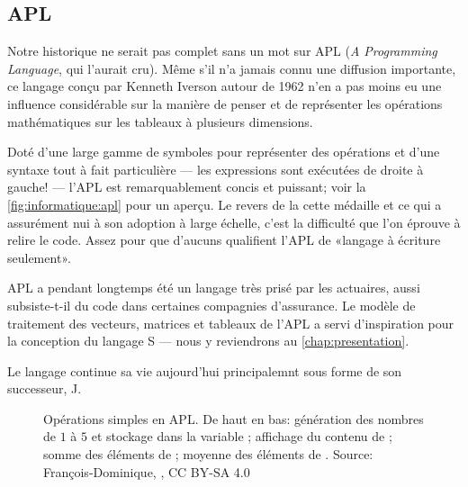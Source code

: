 \subsection{APL}
\label{sec:informatique:historique:apl}

Notre historique ne serait pas complet sans un mot sur APL (\emph{A
  Programming Language}, qui l'aurait cru). Même s'il n'a jamais connu
une diffusion importante, ce langage conçu par Kenneth Iverson autour
de 1962 n'en a pas moins eu une influence considérable sur la manière
de penser et de représenter les opérations mathématiques sur les
tableaux à plusieurs dimensions.

Doté d'une large gamme de symboles pour représenter des opérations et
d'une syntaxe tout à fait particulière --- les expressions sont
exécutées de droite à gauche! --- l'APL est remarquablement concis et
puissant; voir la \autoref{fig:informatique:apl} pour un aperçu. Le
revers de la cette médaille et ce qui a assurément nui à son adoption
à large échelle, c'est la difficulté que l'on éprouve à relire le
code. Assez pour que d'aucuns qualifient l'APL de «langage à écriture
seulement».

APL a pendant longtemps été un langage très prisé par les actuaires,
aussi subsiste-t-il du code dans certaines compagnies d'assurance. Le
modèle de traitement des vecteurs, matrices et tableaux de l'APL a
servi d'inspiration pour la conception du langage S --- nous y
reviendrons au \autoref{chap:presentation}.

Le langage continue sa vie aujourd'hui principalemnt sous forme de son
successeur, J.

\begin{figure}
  \centering
  \caption[Opérations simples en APL.]{Opérations simples en APL. De
    haut en bas: génération des nombres de $1$ à $5$ et stockage dans
    la variable ; affichage du contenu de ; somme des
    éléments de ; moyenne des éléments de . {\small Source:
    François-Dominique,
    , CC BY-SA 4.0}}
  \label{fig:informatique:apl}
\end{figure}

